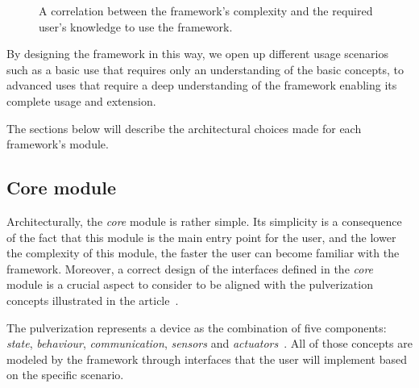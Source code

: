 \begin{figure}
	\centering
	\caption{A correlation between the framework's complexity and the required user's knowledge to use the framework.}
	\label{fig:pyramid-user-knowledge}
\end{figure}

By designing the framework in this way, we open up different usage scenarios such as a basic use that requires only an understanding of the
basic concepts, to advanced uses that require a deep understanding of the framework enabling its complete usage and extension.

The sections below will describe the architectural choices made for each framework's module.

\subsection{Core module}
\label{sec:core-module}

Architecturally, the \emph{core} module is rather simple. Its simplicity is a consequence of the fact that this module is the main entry point
for the user, and the lower the complexity of this module, the faster the user can become familiar with the framework.
Moreover, a correct design of the interfaces defined in the \emph{core} module is a crucial aspect to consider to be aligned with the
pulverization concepts illustrated in the article~\cite{fi12110203}.

The pulverization represents a device as the combination of five components: \emph{state}, \emph{behaviour}, \emph{communication},
\emph{sensors} and \emph{actuators}~\cite{fi12110203}.
All of those concepts are modeled by the framework through interfaces that the user will implement based on the specific scenario.


